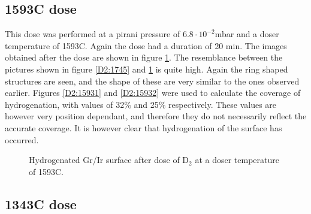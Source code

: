 \subsection{1593\degree C dose}

This dose was performed at a pirani pressure of $6.8 \cdot 10^{-2}$mbar and a doser temperature of 1593\degree C. Again the dose had a duration of 20 min. The images obtained after the dose are shown in figure \ref{D2:1593}. The resemblance between the pictures shown in figure \ref{D2:1745} and \ref{D2:1593} is quite high. Again the ring shaped structures are seen, and the shape of these are very similar to the ones observed earlier. Figures \ref{D2:15931} and \ref{D2:15932} were used to calculate the coverage of hydrogenation, with values of 32\% and 25\% respectively. These values are however very position dependant, and therefore they do not necessarily reflect the accurate coverage. It is however clear that hydrogenation of the surface has occurred.

\begin{figure}[H]
\caption{Hydrogenated Gr/Ir surface after dose of D$_2$ at a doser temperature of 1593\degree C.}
\label{D2:1593}
\end{figure}

\subsection{1343\degree C dose}

